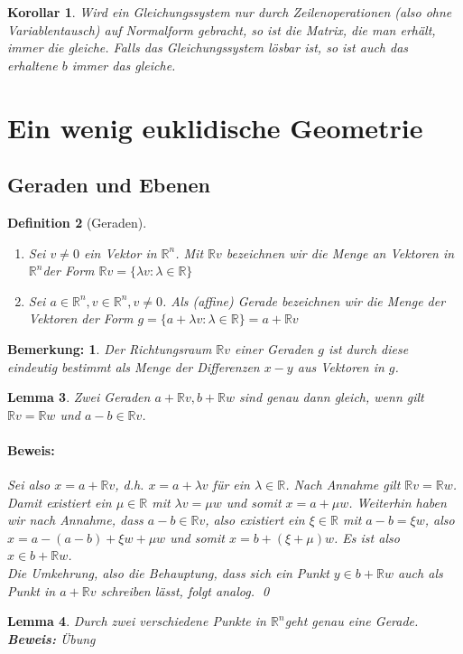 \documentclass{report}
\newcommand{\IN}[1]{\index{#1|BH}}
\newcommand{\lb}{\lambda}
\newcommand{\R}{\mathbb{R}}
\newcommand{\Rn}{\mathbb{R}^n}
\newcommand{\mRn}{$\mathbb{R}^n$}
\theoremstyle{customrem}
\newtheorem*{bemerkung}{Bemerkung\textnormal:}
\theoremstyle{customdef}
\newtheorem{definition}{Definition}[chapter]
\newtheorem{lemma}[definition]{Lemma}
\newtheorem{korrolar}[definition]{Korollar}
\renewenvironment{proof}{\paragraph{Beweis: }}{\qed}
\begin{document}
	\vspace{.2cm}
	\begin{korrolar}
		Wird ein Gleichungssystem \textit{nur} durch Zeilenoperationen (also ohne Variablentausch) auf Normalform gebracht, so ist die Matrix, die man erhält, immer die gleiche. Falls das Gleichungssystem lösbar ist, so ist auch das erhaltene $b$ immer das gleiche.
	\end{korrolar}
	
	\section{Ein wenig euklidische Geometrie}
	
	\subsection{Geraden und Ebenen}
	
	\begin{definition}[Geraden]
		\IN{Gerade}
		$ $\vspace{-.5cm}
		\begin{enumerate}
			\item Sei $v \not= 0$ ein Vektor in \mRn. Mit $\R v$ bezeichnen wir die Menge an Vektoren in \mRn der Form $\R v = \{\lb v : \lb \in \R\}$
			\item Sei $a \in \Rn, v \in \Rn, v \neq 0$. Als (affine) Gerade bezeichnen wir die Menge der Vektoren der Form $g = \{a + \lb v : \lb \in \R\} = a + \R v$
		\end{enumerate}
	\end{definition}
	
	\begin{bemerkung}
		Der Richtungsraum $\R v$ einer Geraden $g$ ist durch diese eindeutig bestimmt als Menge der Differenzen $x - y$ aus Vektoren in $g$.
	\end{bemerkung}
	
	\begin{lemma}
		\IN{Gerade!Gleichheit}
		Zwei Geraden $a + \R v, b + \R w$ sind genau dann gleich, wenn gilt $\R v = \R w$ und $a - b \in \R v$.\\
		\begin{proof}
			Sei also  $x = a + \R v$, d.h. $x = a + \lb v$ für ein $\lb \in \R$. Nach Annahme gilt $\R v = \R w$. Damit existiert ein $\mu \in \R$ mit $\lb v = \mu w$ und somit $x = a + \mu w$. Weiterhin haben wir nach Annahme, dass $a-b \in \R v$, also existiert ein $\xi \in \R$ mit $a - b = \xi w$, also $x = a - (a - b) + \xi w + \mu w$ und somit $x = b + (\xi + \mu) w$.
			Es ist also $x \in b + \R w$.\\
			Die Umkehrung, also die Behauptung, dass sich ein Punkt $y \in b + \R w$ auch als Punkt in $a + \R v$ schreiben lässt, folgt analog.
		\end{proof}
	\end{lemma}
	\vspace{.2cm}
	\begin{lemma}
		Durch zwei verschiedene Punkte in \mRn geht genau eine Gerade.\\
		\textbf{Beweis: } Übung
	\end{lemma}
	
\end{document}
